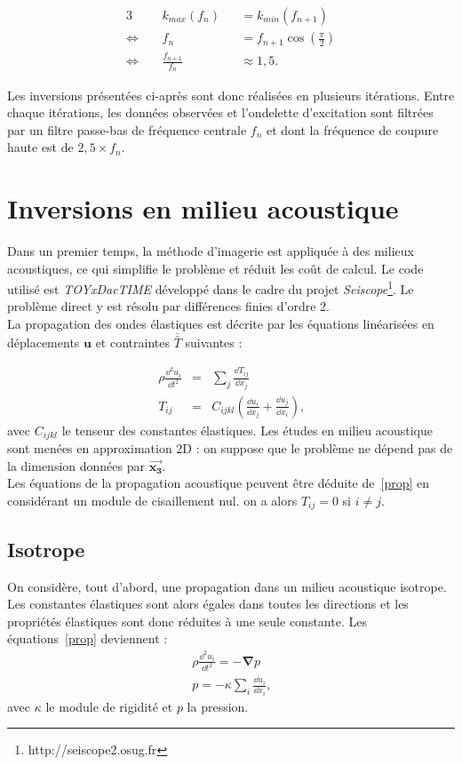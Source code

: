\begin{alignat*}{3}
	  ~&k_{max}(f_{n}) &&= k_{min}(f_{n+1})\\
	\Leftrightarrow~~~~~ &  f_n &&= f_{n+1}\cos \left(\frac{\pi}{2} \right)\\
	 \Leftrightarrow~~~~~ & \frac{f_{n+1}}{f_n} && \approx  1,5.
\end{alignat*} 

Les inversions présentées ci-après sont donc réalisées en plusieurs itérations. Entre chaque itérations, les données observées et l'ondelette d'excitation sont filtrées par un filtre passe-bas de fréquence centrale $f_{n}$ et dont la fréquence de coupure haute est de $2,5 \times f_{n}$.


\section{Inversions en milieu acoustique}

Dans un premier temps, la méthode d'imagerie est appliquée à des milieux acoustiques, ce qui simplifie le problème et réduit les coût de calcul. Le code utilisé est \emph{TOYxDacTIME} développé dans le cadre du projet \emph{Seiscope}\footnote{http://seiscope2.osug.fr}. Le problème direct y est résolu par différences finies d'ordre 2.\\

La propagation des ondes élastiques est décrite par les équations linéarisées en déplacements $\bm{u}$ et contraintes $\bar{\bar T}$ suivantes \citep{mat_ac} : 

\begin{eqnarray}
	\rho \frac{\dd^2 u_{i}}{\dd t^2} &=& \displaystyle\sum_{j}\frac{\dd T_{ij}}{\dd x_{j}}\\
	T_{ij}&=&C_{ijkl}\left( \frac{\dd u_{i}}{\dd x_{j}} + \frac{\dd u_{j}}{\dd x_{i}}\right)\text{,}
	\label{prop}
\end{eqnarray}
avec $C_{ijkl}$ le tenseur des constantes élastiques. Les études en milieu acoustique sont menées en approximation 2D : on suppose que le problème ne dépend pas de la dimension données par $\bm{\overrightarrow{x_3}}$.\\

Les équations de la propagation acoustique peuvent être déduite de~\ref{prop} en considérant un module de cisaillement nul. on a alors $T_{ij}=0$ si $i\neq j$.

\subsection{Isotrope}
On considère, tout d'abord, une propagation dans un milieu acoustique isotrope. Les constantes élastiques sont alors égales dans toutes les directions et les propriétés élastiques sont donc réduites à une seule constante. Les équations~\ref{prop} deviennent : 
\begin{eqnarray}
	\rho \frac{\dd^2 u_{i}}{\dd t^2} = -\bm{\nabla} p\\
	p=-\kappa \displaystyle\sum_{i} \frac{\dd u_{i}}{\dd x_{i}}\text{,}
\end{eqnarray}
avec $\kappa$ le module de rigidité et $p$ la pression.

